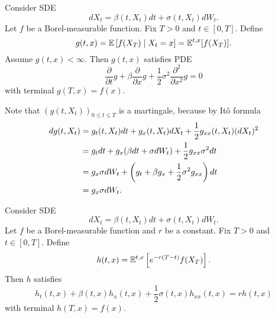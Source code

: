 \begin{thm}
    Consider SDE
    \begin{equation*}
        dX_t = \beta(t,X_t)dt+ \sigma(t,X_t)dW_t.
    \end{equation*}
    Let $f$ be a Borel-measurable function. Fix $T > 0$ and $t \in [0,T]$. Define
    \begin{equation*}
        g(t,x) = \mathbb{E}\left[f(X_T) \mid X_t = x\right] = \mathbb{E}^{t,x}[f(X_T)].
    \end{equation*}
    Assume $g(t,x) < \infty$. Then $g(t,x)$ satisfies PDE
    \begin{equation*}
        \frac{\partial}{\partial t}g + \beta \frac{\partial}{\partial x} g + \frac{1}{2} \sigma^2 \frac{\partial^2}{\partial x^2}g = 0
    \end{equation*}
    with terminal $g(T,x) = f(x)$.
\end{thm}
\begin{rmk}
    Note that $(g(t,X_t))_{0 \leq t \leq T}$ is a martingale, because by It\^o formula
    \begin{align*}
        dg(t,X_t) &= g_t(t,X_t)dt + g_x(t,X_t)dX_t + \frac{1}{2}g_{xx}(t,X_t)(dX_t)^2 \\
        &= g_tdt+g_x(\beta dt + \sigma dW_t) + \frac{1}{2}g_{xx} \sigma^2 dt \\
        &= g_x \sigma dW_t + \left(g_t + \beta g_x + \frac{1}{2}\sigma^2 g_{xx}\right)dt \\
        &= g_x \sigma dW_t.
    \end{align*}
\end{rmk}

\begin{thm}
    Consider SDE
    \begin{equation*}
        dX_t = \beta(t,X_t)dt+ \sigma(t,X_t)dW_t.
    \end{equation*}
    Let $f$ be a Borel-measurable function and $r$ be a constant. Fix $T > 0$ and $t \in [0,T]$. 
    Define
    \begin{equation*}
        h(t,x) = \mathbb{E}^{t,x}\left[e^{-r(T-t)}f(X_T)\right].
    \end{equation*}
    Then $h$ satisfies
    \begin{equation*}
        h_t(t,x) + \beta(t,x)h_x(t,x)+ \frac{1}{2}\sigma(t,x)h_{xx}(t,x) = r h(t,x)
    \end{equation*}
    with terminal $h(T,x) = f(x)$.
\end{thm}

